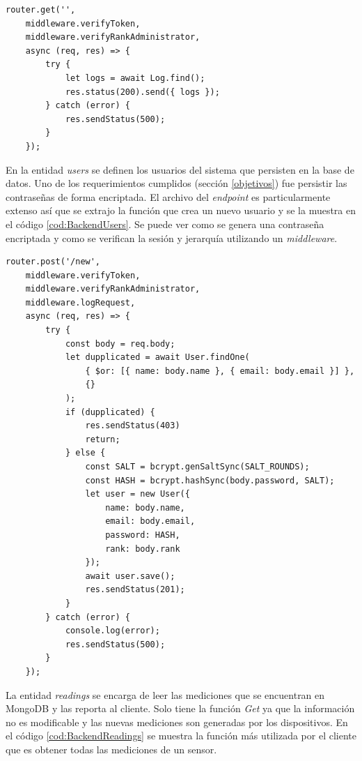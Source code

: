 \begin{lstlisting}[label=cod:BackendLogs,caption=Función principal de la entidad logs]
router.get('',
    middleware.verifyToken,
    middleware.verifyRankAdministrator,
    async (req, res) => {
        try {
            let logs = await Log.find();
            res.status(200).send({ logs });
        } catch (error) {
            res.sendStatus(500);
        }
    });
\end{lstlisting}

En la entidad \emph{users} se definen los usuarios del sistema que persisten en la base de datos.
Uno de los requerimientos cumplidos (sección \ref{objetivos}) fue persistir las contraseñas de forma encriptada.
El archivo del \emph{endpoint} es particularmente extenso así que se extrajo la función que crea un nuevo usuario y se la muestra en el código \ref{cod:BackendUsers}.
Se puede ver como se genera una contraseña encriptada y como se verifican la sesión y jerarquía utilizando un \emph{middleware}.

\begin{lstlisting}[label=cod:BackendUsers,caption=Creación de usuario de la entidad users]
router.post('/new',
    middleware.verifyToken,
    middleware.verifyRankAdministrator,
    middleware.logRequest,
    async (req, res) => {
        try {
            const body = req.body;
            let dupplicated = await User.findOne(
                { $or: [{ name: body.name }, { email: body.email }] },
                {}
            );
            if (dupplicated) {
                res.sendStatus(403)
                return;
            } else {
                const SALT = bcrypt.genSaltSync(SALT_ROUNDS);
                const HASH = bcrypt.hashSync(body.password, SALT);
                let user = new User({
                    name: body.name,
                    email: body.email,
                    password: HASH,
                    rank: body.rank
                });
                await user.save();
                res.sendStatus(201);
            }
        } catch (error) {
            console.log(error);
            res.sendStatus(500);
        }
    });
\end{lstlisting}

La entidad \emph{readings} se encarga de leer las mediciones que se encuentran en MongoDB y las reporta al cliente.
Solo tiene la función \emph{Get} ya que la información no es modificable y las nuevas mediciones son generadas por los dispositivos.
En el código \ref{cod:BackendReadings} se muestra la función más utilizada por el cliente que es obtener todas las mediciones de un sensor.


